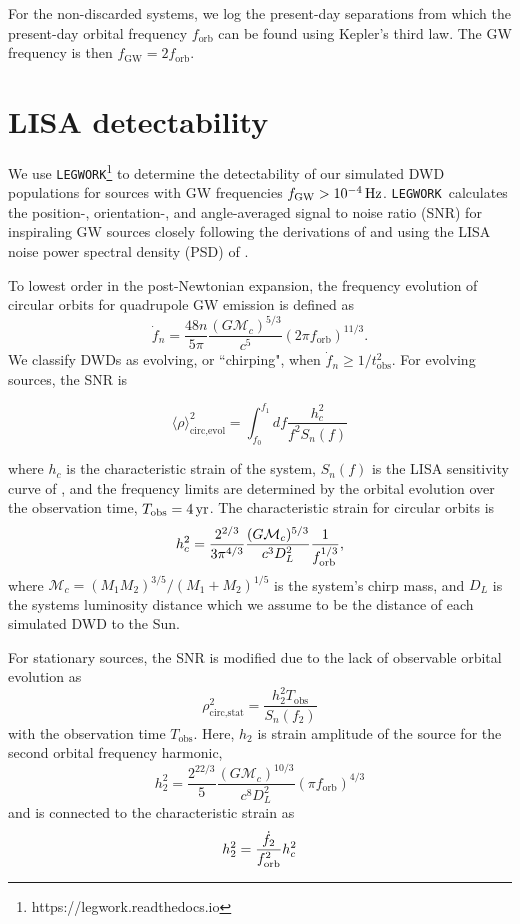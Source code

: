 \documentclass[twocolumn, linenumbers]{aastex631}
\newcommand{\legwork}{\texttt{LEGWORK}}
\begin{document}
For the non-discarded systems, we log the present-day separations from which the present-day orbital frequency $f_\text{orb}$ can be found using Kepler's third law. The GW frequency is then $f_\text{GW} = 2f_\text{orb}$.


\section{LISA detectability}
\label{sec:LISA_obs}
We use \legwork\footnote{https://legwork.readthedocs.io} \citep{Wagg2021} to determine the detectability of our simulated DWD populations for sources with GW frequencies $f_{\rm{GW}}>10^{-4}\,\rm{Hz}$. \legwork\ calculates the position-, orientation-, and angle-averaged signal to noise ratio (SNR) for inspiraling GW sources closely following the derivations of \citet{Flanagan1998} and using the LISA noise power spectral density (PSD) of \citet{Robson2019}. 

To lowest order in the post-Newtonian expansion, the frequency evolution of circular orbits for quadrupole GW emission is defined as
\begin{equation}
    \Dot{f}_n = \frac{48n}{5\pi} \frac{(G\mathcal{M}_c)^{5/3}}{c^5} (2\pi f_\text{orb})^{11/3}.
\end{equation}
We classify DWDs as evolving, or ``chirping", when $\Dot{f}_n \geq 1/t_\text{obs}^2$. For evolving sources, the SNR is

\begin{equation}
   \langle \rho \rangle^2_{\text{circ,evol}} = \int_{f_0}^{f_1}df   \frac{h_{c}^2}{f^2S_n(f)}
\end{equation}

\noindent where $h_c$ is the characteristic strain of the system, $S_n(f)$ is the LISA sensitivity curve of \citet{Robson2019}, and the frequency limits are determined by the orbital evolution over the observation time, $T_{\rm{obs}}=4\,\rm{yr}$. The characteristic strain for circular orbits is 
\begin{equation}
    h_{c}^2 = \frac{2^{2/3}}{3 \pi^{4/3}} \frac{(G \mathcal{M}_c)^{5/3}}{c^3 D_L^2} \frac{1}{f_{\rm orb}^{1/3}},
\end{equation}
\noindent where $\mathcal{M}_c = (M_1M_2)^{3/5}/(M_1 + M_2)^{1/5}$ is the system's chirp mass, and $D_L$ is the systems luminosity distance which we assume to be the distance of each simulated DWD to the Sun. 

For stationary sources, the SNR is modified due to the lack of observable orbital evolution as
\begin{equation}
    \rho_{\text{circ,stat}}^2 = \frac{h_{2}^2T_{\text{obs}}}{ S_n(f_2)}
\end{equation}
with the observation time $T_{\text{obs}}$. Here, $h_2$ is strain amplitude of the source for the second orbital frequency harmonic,
\begin{equation}
   h_2^2 = \frac{2^{22/3}}{5}\frac{(G\mathcal{M}_c)^{10/3}}{c^8D_L^2}(\pi f_\text{orb})^{4/3}
\end{equation}
and is connected to the characteristic strain as
\begin{equation}
    h_2^2 = \frac{\dot{f}_{2}}{f_{\rm{orb}}^2} h_c^2
\end{equation}
\end{document}
